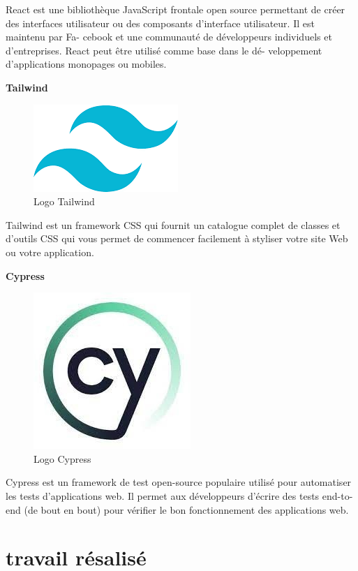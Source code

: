 React est une bibliothèque JavaScript frontale open source 
permettant de créer des interfaces utilisateur ou des composants 
d’interface utilisateur. Il est maintenu par Fa- cebook et une 
communauté de développeurs individuels et d’entreprises. React 
peut être utilisé comme base dans le dé- veloppement d’applications 
monopages ou mobiles.
\newline

\large
\textbf{Tailwind}
\begin{figure}[htbp]
   \centering
   \includegraphics[scale=0.6]{Images/tailwind.png} 
   \caption{Logo Tailwind}
   \label{fig:tailwind}
\end{figure}

Tailwind est un framework CSS qui fournit un catalogue complet de 
classes et d’outils CSS qui vous permet de commencer facilement 
à styliser votre site Web ou votre application.
\newline

\large
\textbf{Cypress}
\begin{figure}[htbp]
   \centering
   \includegraphics[scale=0.6]{Images/cy.jpg} 
   \caption{Logo Cypress}
   \label{fig:4D}
\end{figure}

Cypress est un framework de test open-source populaire utilisé 
pour automatiser les tests d’applications web. Il permet aux 
développeurs d’écrire des tests end-to-end (de bout en bout) pour 
vérifier le bon fonctionnement des applications web.

\section{travail résalisé}
